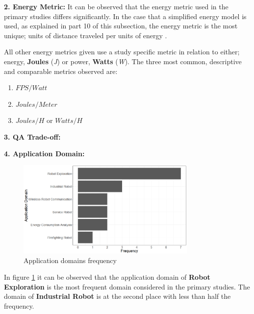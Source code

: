 \vspace{2mm}

\noindent\textbf{2. Energy Metric:} %
It can be observed that the energy metric used in the primary studies differs significantly.
In the case that a simplified energy model is used, as explained in part 10 of this subsection, the energy metric is the most unique;
units of distance traveled per units of energy \cite{mei2006mobile_exploration, patel2012exploration_strategy}.

All other energy metrics given use a study specific metric in relation to either; energy, \textbf{Joules} (\textit{J}) or power, \textbf{Watts} (\textit{W}).
The three most common, descriptive and comparable metrics observed are:
\begin{enumerate}
    \item $FPS / Watt$ \cite{cheng2018FPGA_image_recognition}
    \item $Joules / Meter$ \cite{licea2013wireless_comms}
    \item $Joules / H$ or $Watts / H$ \cite{kim2016firefighting_robot,barili1995efficient_motion}
\end{enumerate}

\vspace{2mm}

\noindent\textbf{3. QA Trade-off:}

\vspace{2mm}

\noindent\textbf{4. Application Domain:}
\begin{figure}[t]
    \includegraphics[width=250pt]{figures/app_domains_freq.png}
    \caption{Application domains frequency}
    \label{fig:app_domains}
\end{figure}
In figure \ref{fig:app_domains} it can be observed that the application domain of \textbf{Robot Exploration} is the most frequent
domain considered in the primary studies. 
The domain of \textbf{Industrial Robot} is at the second place with less than half the frequency.

